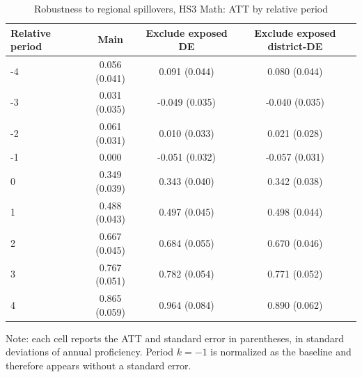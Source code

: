 ﻿\begin{table}[!htbp]
\centering
\caption{Robustness to regional spillovers, HS3 Math: ATT by relative period}
\label{tab:ap_event_spillover_HS3_mat}
\vspace{-0.15cm}
\scriptsize
\setlength{\tabcolsep}{4pt}
\renewcommand{\arraystretch}{0.92}
\begin{tabular}{lccc}
\toprule
Relative period & Main & Exclude exposed DE & Exclude exposed district-DE \\
\midrule
-4 & 0.056 (0.041) & 0.091 (0.044) & 0.080 (0.044) \\
-3 & 0.031 (0.035) & -0.049 (0.035) & -0.040 (0.035) \\
-2 & 0.061 (0.031) & 0.010 (0.033) & 0.021 (0.028) \\
-1 & 0.000 & -0.051 (0.032) & -0.057 (0.031) \\
0 & 0.349 (0.039) & 0.343 (0.040) & 0.342 (0.038) \\
1 & 0.488 (0.043) & 0.497 (0.045) & 0.498 (0.044) \\
2 & 0.667 (0.045) & 0.684 (0.055) & 0.670 (0.046) \\
3 & 0.767 (0.051) & 0.782 (0.054) & 0.771 (0.052) \\
4 & 0.865 (0.059) & 0.964 (0.084) & 0.890 (0.062) \\
\bottomrule
\end{tabular}
\begin{flushleft}
\footnotesize Note: each cell reports the ATT and standard error in parentheses, in standard deviations of annual proficiency. Period \(k=-1\) is normalized as the baseline and therefore appears without a standard error.
\end{flushleft}
\end{table}




